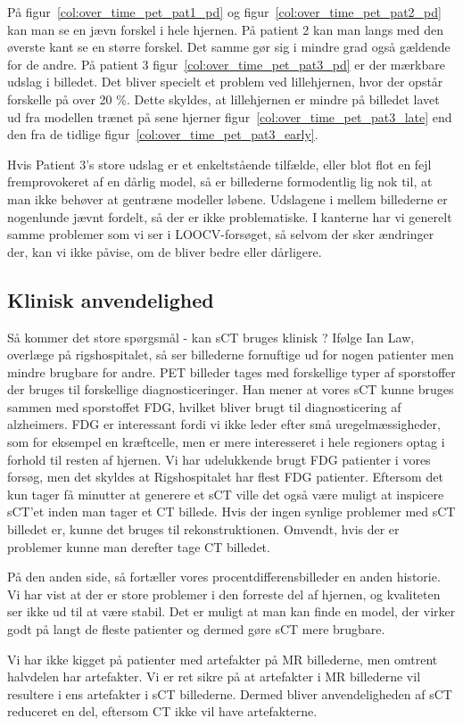 På figur~\ref{col:over_time_pet_pat1_pd} og
figur~\ref{col:over_time_pet_pat2_pd} kan man se en jævn forskel i hele
hjernen. På patient 2 kan man langs med den øverste kant se en større
forskel. Det samme gør sig i mindre grad også gældende for de andre.
På patient 3 figur~\ref{col:over_time_pet_pat3_pd} er der mærkbare
udslag i billedet. Det bliver specielt et problem ved lillehjernen, hvor
der opstår forskelle på over 20 \%. Dette skyldes, at lillehjernen
er mindre på billedet lavet ud fra modellen trænet på sene hjerner
figur~\ref{col:over_time_pet_pat3_late} end den fra de tidlige
figur~\ref{col:over_time_pet_pat3_early}.

Hvis Patient 3’s store udslag er et enkeltstående tilfælde, eller
blot flot en fejl fremprovokeret af en dårlig model, så er billederne
formodentlig lig nok til, at man ikke behøver at gentræne modeller
løbene. Udslagene i mellem billederne er nogenlunde jævnt fordelt, så
der er ikke problematiske. I kanterne har vi generelt samme problemer
som vi ser i LOOCV-forsøget, så selvom der sker ændringer der, kan vi
ikke påvise, om de bliver bedre eller dårligere.

\subsection{Klinisk anvendelighed}

Så kommer det store spørgsmål - kan sCT bruges klinisk ?  Ifølge Ian Law, overlæge på rigshospitalet, så ser billederne fornuftige ud for nogen patienter men mindre brugbare for andre. PET billeder tages med forskellige typer af sporstoffer der bruges til forskellige diagnosticeringer. Han mener at vores sCT kunne bruges sammen med sporstoffet FDG, hvilket bliver brugt til diagnosticering af alzheimers. FDG er interessant fordi vi ikke leder efter små uregelmæssigheder, som for eksempel en kræftcelle, men er mere interesseret i hele regioners optag i forhold til resten af hjernen. Vi har udelukkende brugt FDG patienter i vores forsøg, men det skyldes at Rigshospitalet har flest FDG patienter. Eftersom det kun tager få minutter at generere et sCT ville det også være muligt at inspicere sCT’et inden man tager et CT billede. Hvis der ingen synlige problemer med sCT billedet er, kunne det bruges til rekonstruktionen. Omvendt, hvis der er problemer kunne man derefter tage CT billedet.

På den anden side, så fortæller vores procentdifferensbilleder en anden historie. Vi har vist at der er store problemer i den forreste del af hjernen, og kvaliteten ser ikke ud til at være stabil. Det er muligt at man kan finde en model, der virker godt på langt de fleste patienter og dermed gøre sCT mere brugbare.

Vi har ikke kigget på patienter med artefakter på MR billederne, men omtrent halvdelen har artefakter. Vi er ret sikre på at artefakter i MR billederne vil resultere i ens artefakter i sCT billederne. Dermed bliver anvendeligheden af sCT reduceret en del, eftersom CT ikke vil have artefakterne.

